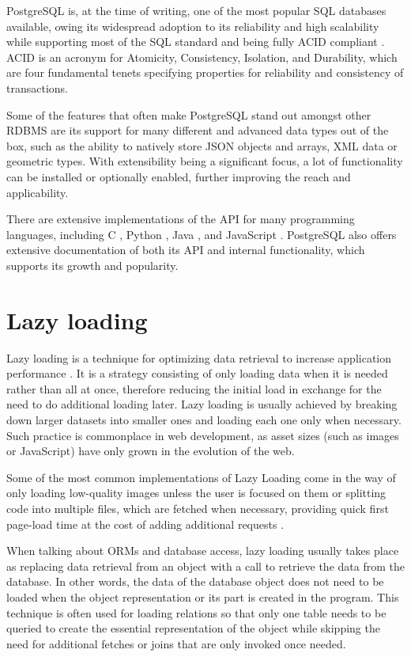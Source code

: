 PostgreSQL is, at the time of writing, one of the most popular SQL databases
available, owing its widespread adoption to its reliability and high scalability
while supporting most of the SQL standard and being fully ACID compliant
\cite{postgres-transaction}. ACID is an acronym for Atomicity, Consistency,
Isolation, and Durability, which are four fundamental tenets specifying
properties for reliability and consistency of transactions.

Some of the features that often make PostgreSQL stand out amongst other RDBMS
are its support for many different and advanced data types
\cite{postgres-datatypes} out of the box, such as the ability to natively store
JSON objects and arrays, XML data or geometric types. With extensibility being a
significant focus, a lot of functionality can be installed or optionally
enabled, further improving the reach and applicability.

There are extensive implementations of the API for many programming languages,
including C \cite{libpq}, Python \cite{psycopg2}, Java \cite{pgJDBC}, and
JavaScript \cite{node-postgres}. PostgreSQL also offers extensive documentation
of both its API and internal functionality, which supports its growth and
popularity.

\section*{Lazy loading}
Lazy loading is a technique for optimizing data retrieval to increase
application performance \cite[p.~200]{fowler-patterns-2003}. It is a strategy consisting of
only loading data when it is needed rather than all at once, therefore reducing
the initial load in exchange for the need to do additional loading later. Lazy
loading is usually achieved by breaking down larger datasets into smaller ones
and loading each one only when necessary. Such practice is commonplace in web
development, as asset sizes (such as images or JavaScript) have only grown in
the evolution of the web.

Some of the most common implementations of Lazy Loading come in the way of only
loading low-quality images unless the user is focused on them or splitting code
into multiple files, which are fetched when necessary, providing quick first
page-load time at the cost of adding additional requests
\cite{webPerformanceMDN}.

When talking about ORMs and database access, lazy loading usually takes place as
replacing data retrieval from an object with a call to retrieve the data from
the database. In other words, the data of the database object does not need to
be loaded when the object representation or its part is created in the program.
This technique is often used for loading relations so that only one table needs
to be queried to create the essential representation of the object while
skipping the need for additional fetches or joins that are only invoked once
needed.

